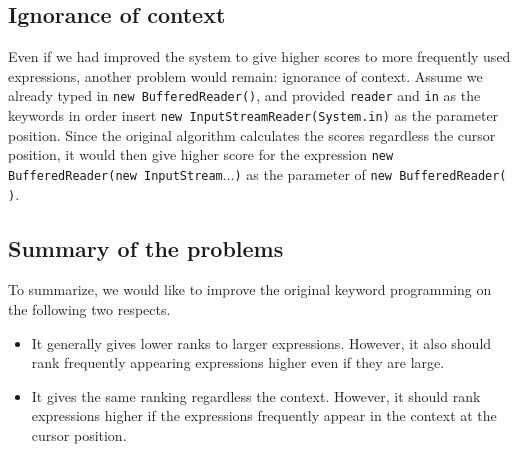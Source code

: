 \documentclass[PRO,english]{ipsj}
\begin{document}


\subsection{Ignorance of context}

Even if we had improved the system to give higher scores to more frequently used expressions, another problem would remain: ignorance of context.  Assume we already typed in \texttt{new BufferedReader()}, and provided \texttt{reader} and \texttt{in} as the keywords in order insert \texttt{new InputStreamReader(System.in)} as the parameter position.  Since the original algorithm calculates the scores regardless the cursor position, it would then give higher score for the expression \texttt{new BufferedReader(new InputStream$\ldots$)} as the parameter of \texttt{new BufferedReader( )}.

\subsection{Summary of the problems}

To summarize, we would like to improve the original keyword programming on the following two respects.
\begin{itemize}
\item It generally gives lower ranks to larger expressions.  However, it also should rank frequently appearing expressions higher even if they are large.  %
\item It gives the same ranking regardless the context.  However, it should rank expressions higher if the expressions frequently appear in the context at the cursor position.
\end{itemize}
\end{document}
